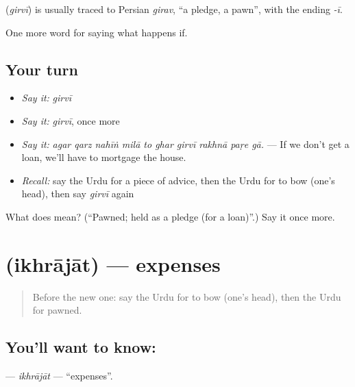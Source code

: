 \begin{cousinweb}
\textbf{} (\emph{girvī}) is usually traced to Persian \emph{girav}, \textquotedblleft{}a pledge, a pawn\textquotedblright{}, with the ending \emph{-ī}.
\end{cousinweb}

\begin{grammarlens}[title={What you've built}]
One more word for saying what happens if.
\end{grammarlens}

\subsection*{Your turn}
\begin{itemize}
\raggedright
  \item \emph{Say it:} \emph{girvī}
  \item \emph{Say it:} \emph{girvī}, once more
  \item \emph{Say it:} \emph{agar qarz nahīṅ milā to ghar girvī rakhnā paṛe gā.} — If we don't get a loan, we'll have to mortgage the house.
  \item \emph{Recall:} say the Urdu for a piece of advice, then the Urdu for to bow (one's head), then say \emph{girvī} again
\end{itemize}

\begin{tcolorbox}[breakable,colback=teal!4,colframe=teal!35!black,title={Before you move on}]
What does  mean? (\textquotedblleft{}Pawned; held as a pledge (for a loan)\textquotedblright{}.) Say it once more.
\end{tcolorbox}
\section[\texorpdfstring{\ur{اخراجات} (ikhrājāt)}{اخراجات (ikhrājāt)}]{ (ikhrājāt) — expenses}

\label{lesson:UR-C540-ikhrajat}



\begin{quote}
Before the new one: say the Urdu for to bow (one's head), then the Urdu for pawned.
\end{quote}

\subsection*{You'll want to know: }
\textbf{} — \emph{ikhrājāt} — \textquotedblleft{}expenses\textquotedblright{}.


